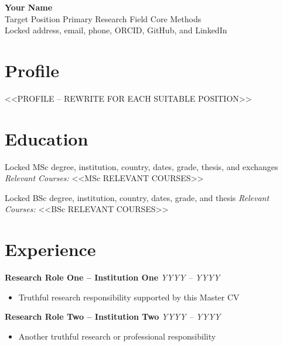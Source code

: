 \documentclass[a4paper,10pt]{article}
\begin{document}
{\Huge \textbf{Your Name}}\\
{\normalsize Target Position \textbar{} Primary Research Field \textbar{} Core Methods}\\[0.5em]
Locked address, email, phone, ORCID, GitHub, and LinkedIn


\section*{Profile}
<<PROFILE -- REWRITE FOR EACH SUITABLE POSITION>>

\section*{Education}
Locked MSc degree, institution, country, dates, grade, thesis, and exchanges
\textit{Relevant Courses:} <<MSc RELEVANT COURSES>>

Locked BSc degree, institution, country, dates, grade, and thesis
\textit{Relevant Courses:} <<BSc RELEVANT COURSES>>

\section*{Experience}
\textbf{Research Role One -- Institution One} \hfill \textit{YYYY -- YYYY}\\
\begin{itemize}[leftmargin=1.5em, noitemsep]
  \item Truthful research responsibility supported by this Master CV
\end{itemize}
\vspace{0.4em}
\textbf{Research Role Two -- Institution Two} \hfill \textit{YYYY -- YYYY}\\
\begin{itemize}[leftmargin=1.5em, noitemsep]
  \item Another truthful research or professional responsibility
\end{itemize}
\end{document}
